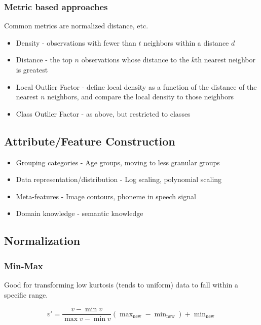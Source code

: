 \documentclass{idc_msc}
\begin{document}
\subsubsection{Metric based approaches}

Common metrics are normalized distance, etc.

\begin{itemize}
  \item Density - observations with fewer than \(t\) neighbors within a distance \(d\)
  \item Distance - the top \(n\) observations whose distance to the \(k\)th nearest neighbor is greatest
  \item Local Outlier Factor - define local density as a function of the distance of the nearest \(n\) neighbors, and compare the local density to those neighbors
  \item Class Outlier Factor - as above, but restricted to classes
\end{itemize}

\subsection{Attribute/Feature Construction}

\begin{itemize}
  \item Grouping categories - Age groups, moving to less granular groups
  \item Data representation/distribution - Log scaling, polynomial scaling
  \item Meta-features - Image contours, phoneme in speech signal
  \item Domain knowledge - semantic knowledge
\end{itemize}

\subsection{Normalization}

\subsubsection{Min-Max}

Good for transforming low kurtosis (tends to uniform) data to fall within a specific range.

\[v' = \frac{v-\min v}{\max v - \min v}(\max\nolimits_{\text{new}} - \min\nolimits_{\text{new}}) + \min\nolimits_{\text{new}}\]
\end{document}
